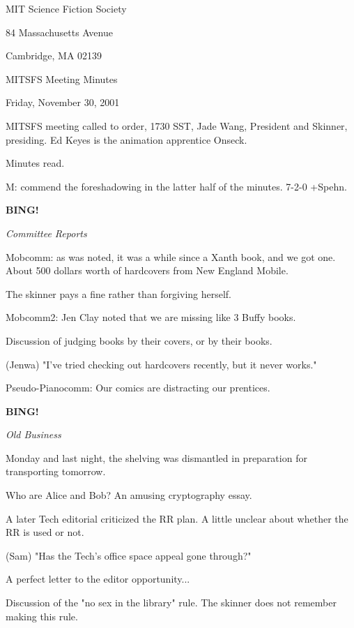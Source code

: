 \documentclass[12pt]{article}
\newcommand{\bing}{{\bf BING!} }
\newcommand{\goto}[1]{\bing \vskip 12pt \centerline{{\em{#1}}}}
\begin{document}
\begin{center}

MIT Science Fiction Society 

84 Massachusetts Avenue

Cambridge, MA 02139

\vspace{12pt}

MITSFS Meeting Minutes 

Friday, November 30, 2001

\end{center}
 
\vspace{18pt}

\setlength{\parskip}{6pt}

\noindent
MITSFS meeting called to order, 1730 SST, Jade Wang, President and Skinner, presiding.  Ed Keyes is the animation apprentice Onseck.

Minutes read.

M: commend the foreshadowing in the latter half of the minutes. 7-2-0 +Spehn.

\goto{Committee Reports}

Mobcomm: as was noted, it was a while since a Xanth book, and we got one. About 500 dollars worth of hardcovers from New England Mobile.

The skinner pays a fine rather than forgiving herself.

Mobcomm2: Jen Clay noted that we are missing like 3 Buffy books.

Discussion of judging books by their covers, or by their books.

(Jenwa) "I've tried checking out hardcovers recently, but it never works."

Pseudo-Pianocomm: Our comics are distracting our prentices.

\goto{Old Business}

Monday and last night, the shelving was dismantled in preparation for transporting tomorrow.

Who are Alice and Bob? An amusing cryptography essay.

A later Tech editorial criticized the RR plan. A little unclear about whether the RR is used or not.

(Sam) "Has the Tech's office space appeal gone through?"

A perfect letter to the editor opportunity...

Discussion of the "no sex in the library" rule. The skinner does not remember making this rule.
\end{document}
